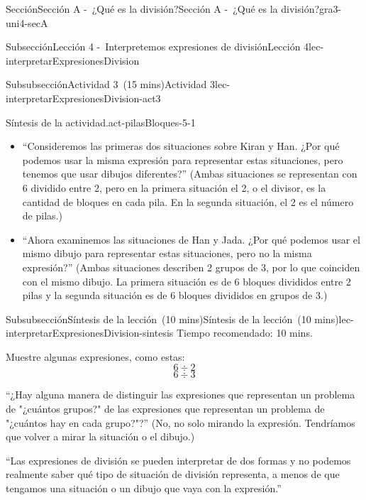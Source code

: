 \documentclass[oneside,10pt,]{article}
\begin{document}
\begin{sectionptx}{Sección}{Sección A -~¿Qué es la división?}{}{Sección A -~¿Qué es la división?}{}{}{gra3-uni4-secA}
\begin{subsectionptx}{Subsección}{Lección 4 -~Interpretemos expresiones de división}{}{Lección 4}{}{}{lec-interpretarExpresionesDivision}
\begin{subsubsectionptx}{Subsubsección}{Actividad 3~(15 mins)}{}{Actividad 3}{}{}{lec-interpretarExpresionesDivision-act3}
\begin{paragraphs}{Síntesis de la actividad.}{act-pilasBloques-5-1}
\begin{itemize}[label=\textbullet]
\item{}``Consideremos las primeras dos situaciones sobre Kiran y Han. ¿Por qué podemos usar la misma expresión para representar estas situaciones, pero tenemos que usar dibujos diferentes?'' (Ambas situaciones se representan con 6 dividido entre 2, pero en la primera situación el 2, o el divisor, es la cantidad de bloques en cada pila. En la segunda situación, el 2 es el número de pilas.)%
\item{}``Ahora examinemos las situaciones de Han y Jada. ¿Por qué podemos usar el mismo dibujo para representar estas situaciones, pero no la misma expresión?'' (Ambas situaciones describen 2 grupos de 3, por lo que coinciden con el mismo dibujo. La primera situación es de 6 bloques divididos entre 2 pilas y la segunda situación es de 6 bloques divididos en grupos de 3.)%
\end{itemize}
\end{paragraphs}%
\end{subsubsectionptx}
%
%
\typeout{************************************************}
\typeout{************************************************}
%
\begin{subsubsectionptx}{Subsubsección}{Síntesis de la lección~(10 mins)}{}{Síntesis de la lección~(10 mins)}{}{}{lec-interpretarExpresionesDivision-sintesis}
Tiempo recomendado: 10 mins.%
\par
Muestre algunas expresiones, como estas:%
\begin{equation*}
6\div 2
\end{equation*}
%
\begin{equation*}
6\div 3
\end{equation*}
%
\par
``¿Hay alguna manera de distinguir las expresiones que representan un problema de "¿cuántos grupos?" de las expresiones que representan un problema de "¿cuántos hay en cada grupo?"?'' (No, no solo mirando la expresión. Tendríamos que volver a mirar la situación o el dibujo.)%
\par
``Las expresiones de división se pueden interpretar de dos formas y no podemos realmente saber qué tipo de situación de división representa, a menos de que tengamos una situación o un dibujo que vaya con la expresión.''%
\end{subsubsectionptx}
%
%
\typeout{************************************************}
\typeout{************************************************}

\end{subsectionptx}
\end{sectionptx}
\end{document}
